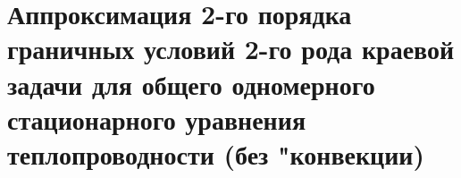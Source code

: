 \documentclass[__main__.tex]{subfiles}
\begin{document}
\section{Аппроксимация 2-го порядка граничных условий 2-го рода краевой задачи для общего одномерного стационарного уравнения теплопроводности (без "конвекции)}
\end{document}
